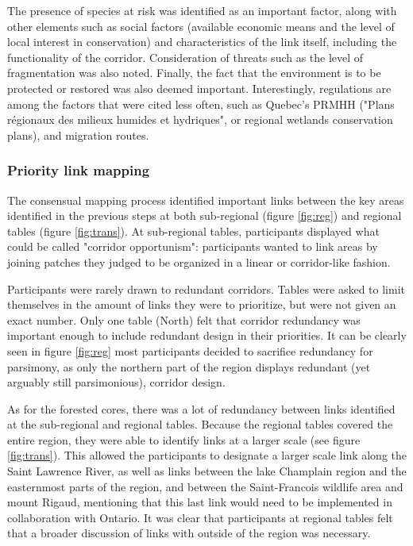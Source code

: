 The presence of species at risk was identified as an important factor, along with other elements such as social factors (available economic means and the level of local interest in conservation) and characteristics of the link itself, including the functionality of the corridor. Consideration of threats such as the level of fragmentation was also noted. Finally, the fact that the environment is to be protected or restored was also deemed important. Interestingly, regulations are among the factors that were cited less often, such as Quebec's PRMHH ("Plans régionaux des milieux humides et hydriques", or regional wetlands conservation plans), and migration routes. \\

\subsubsection*{Priority link mapping}

The consensual mapping process identified important links between the key areas identified in the previous steps at both sub-regional (figure \ref{fig:reg}) and regional tables (figure \ref{fig:trans}). At sub-regional tables, participants displayed what could be called "corridor opportunism": participants wanted to link areas by joining patches they judged to be organized in a linear or corridor-like fashion.

Participants were rarely drawn to redundant corridors. Tables were asked to limit themselves in the amount of links they were to prioritize, but were not given an exact number. Only one table (North) felt that corridor redundancy was important enough to include redundant design in their priorities. It can be clearly seen in figure \ref{fig:reg} most participants decided to sacrifice redundancy for parsimony, as only the northern part of the region displays redundant (yet arguably still parsimonious), corridor design.

As for the forested cores, there was a lot of redundancy between links identified at the sub-regional and regional tables. Because the regional tables covered the entire region, they were able to identify links at a larger scale (see figure \ref{fig:trans}). This allowed the participants to designate a larger scale link along the Saint Lawrence River, as well as links between the lake Champlain region and the easternmost parts of the region, and between the Saint-Francois wildlife area and mount Rigaud, mentioning that this last link would need to be implemented in collaboration with Ontario. It was clear that participants at regional tables felt that a broader discussion of links with outside of the region was necessary. \\

